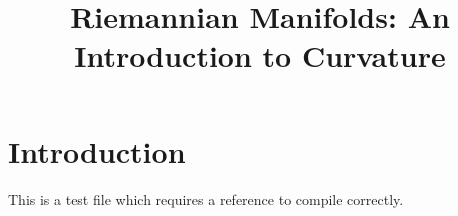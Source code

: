 


%


\title{Riemannian Manifolds: An Introduction to Curvature}


\maketitle

\label{section-phantom}

\tableofcontents

\section{Introduction}
\label{section-introduction}

This is a test file which requires a reference to compile correctly. \cite{Maclane}







